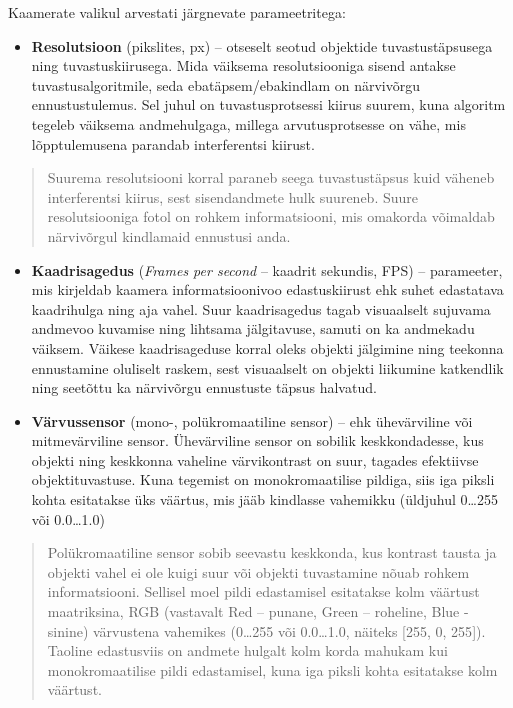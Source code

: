 Kaamerate valikul arvestati järgnevate parameetritega:

\begin{itemize}
\tightlist
\item
  \textbf{Resolutsioon} (pikslites, px) -- otseselt seotud objektide tuvastustäpsusega ning tuvastuskiirusega. Mida väiksema resolutsiooniga sisend antakse tuvastusalgoritmile, seda ebatäpsem/ebakindlam on närvivõrgu ennustustulemus. Sel juhul on tuvastusprotsessi kiirus suurem, kuna algoritm tegeleb väiksema andmehulgaga, millega arvutusprotsesse on vähe, mis lõpptulemusena parandab interferentsi kiirust.
\end{itemize}

\begin{quote}
Suurema resolutsiooni korral paraneb seega tuvastustäpsus kuid väheneb interferentsi kiirus, sest sisendandmete hulk suureneb. Suure resolutsiooniga fotol on rohkem informatsiooni, mis omakorda võimaldab närvivõrgul kindlamaid ennustusi anda.
\end{quote}

\begin{itemize}
\item
  \textbf{Kaadrisagedus} (\emph{Frames per second} -- kaadrit sekundis, FPS) -- parameeter, mis kirjeldab kaamera informatsioonivoo edastuskiirust ehk suhet edastatava kaadrihulga ning aja vahel. Suur kaadrisagedus tagab visuaalselt sujuvama andmevoo kuvamise ning lihtsama jälgitavuse, samuti on ka andmekadu väiksem. Väikese kaadrisageduse korral oleks objekti jälgimine ning teekonna ennustamine oluliselt raskem, sest visuaalselt on objekti liikumine katkendlik ning seetõttu ka närvivõrgu ennustuste täpsus halvatud.
\item
  \textbf{Värvussensor} (mono-, polükromaatiline sensor) -- ehk ühevärviline või mitmevärviline sensor. Ühevärviline sensor on sobilik keskkondadesse, kus objekti ning keskkonna vaheline värvikontrast on suur, tagades efektiivse objektituvastuse. Kuna tegemist on monokromaatilise pildiga, siis iga piksli kohta esitatakse üks väärtus, mis jääb kindlasse vahemikku (üldjuhul 0\ldots255 või 0.0\ldots1.0)
\end{itemize}

\begin{quote}
Polükromaatiline sensor sobib seevastu keskkonda, kus kontrast tausta ja objekti vahel ei ole kuigi suur või objekti tuvastamine nõuab rohkem informatsiooni. Sellisel moel pildi edastamisel esitatakse kolm väärtust maatriksina, RGB (vastavalt Red -- punane, Green -- roheline, Blue - sinine) värvustena vahemikes (0\ldots255 või 0.0\ldots1.0, näiteks {[}255, 0, 255{]}). Taoline edastusviis on andmete hulgalt kolm korda mahukam kui monokromaatilise pildi edastamisel, kuna iga piksli kohta esitatakse kolm väärtust.
\end{quote}

